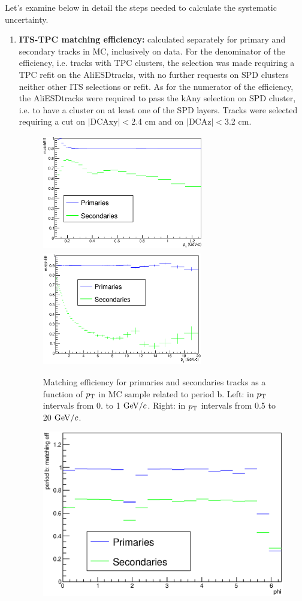 Let's examine below in detail the steps needed to 
calculate the systematic uncertainty.
\begin{enumerate}
\item {\bf ITS-TPC matching efficiency:} calculated separately for 
primary and secondary tracks in MC, inclusively on data. For the denominator
of the efficiency, i.e. tracks with TPC clusters, the selection was 
made requiring a TPC refit on the AliESDtracks, with no further 
requests on SPD clusters neither other ITS selections or refit. As 
for the numerator of the efficiency, the AliESDtracks were required 
to pass the kAny selection on SPD cluster, i.e. to have a cluster 
on at least one of the SPD layers. Tracks were selected requiring 
a cut on $|$DCAxy$|<$2.4 cm and on $|$DCAz$|<$3.2 cm.
\begin{figure}[!htb]
\includegraphics[height=5cm, width=7cm]{FigCap4/PT0_match_effprimsec.eps}
\includegraphics[height=5cm, width=7cm]{FigCap4/Allpt_matchingeff.eps}
\caption{Matching efficiency for primaries and secondaries tracks as a function of $p_{\rm T}$ in MC sample related to  period b.  Left:  in $p_{\rm T}$ intervals from 0. to 1 $\mathrm{GeV}/c$. Right: in $p_{\rm T}$ intervals from 0.5 to 20 $\mathrm{GeV}/c$. }
\label{fig:matcheff_pt}
\end{figure}
\begin{figure}[!htb]
\begin{center}
\includegraphics[width=.49\textwidth]{FigCap4/phi_allpt.eps}

\end{center}
\end{figure}
\end{enumerate}
